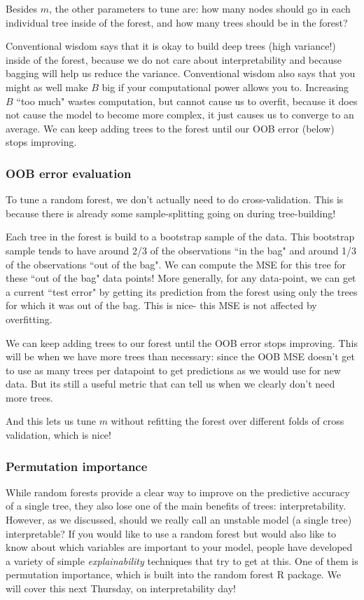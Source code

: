 Besides $m$, the other parameters to tune are: how many nodes should go in each individual tree inside of the forest, and how many trees should be in the forest? 

Conventional wisdom says that it is okay to build deep trees (high variance!) inside of the forest, because we do not care about interpretability and because bagging will help us reduce the variance. Conventional wisdom also says that you might as well make $B$ big if your computational power allows you to. Increasing $B$ ``too much" wastes computation, but cannot cause us to overfit, because it does not cause the model to become more complex, it just causes us to converge to an average. We can keep adding trees to the forest until our OOB error (below) stops improving. 

\subsubsection{OOB error evaluation}

To tune a random forest, we don't actually need to do cross-validation. This is because there is already some sample-splitting going on during tree-building! 

Each tree in the forest is build to a bootstrap sample of the data. This bootstrap sample tends to have around 2/3 of the observations ``in the bag" and around 1/3 of the observations ``out of the bag". We can compute the MSE for this tree for these ``out of the bag" data points! More generally, for any data-point, we can get a current ``test error" by getting its prediction from the forest using only the trees for which it was out of the bag. This is nice- this MSE is not affected by overfitting. 

We can keep adding trees to our forest until the OOB error stops improving. This will be when we have more trees than necessary: since the OOB MSE doesn't get to use as many trees per datapoint to get predictions as we would use for new data. But its still a useful metric that can tell us when we clearly don't need more trees. 

And this lets us tune $m$ without refitting the forest over different folds of cross validation, which is nice!

\subsubsection{Permutation importance}

While random forests provide a clear way to improve on the predictive accuracy of a single tree, they also lose one of the main benefits of trees: interpretability. However, as we discussed, should we really call an unstable model (a single tree) interpretable? If you would like to use a random forest but would also like to know about which variables are important to your model, people have developed a variety of simple \emph{explainability} techniques that try to get at this. One of them is permutation importance, which is built into the random forest R package. We will cover this next Thursday, on interpretability day!


